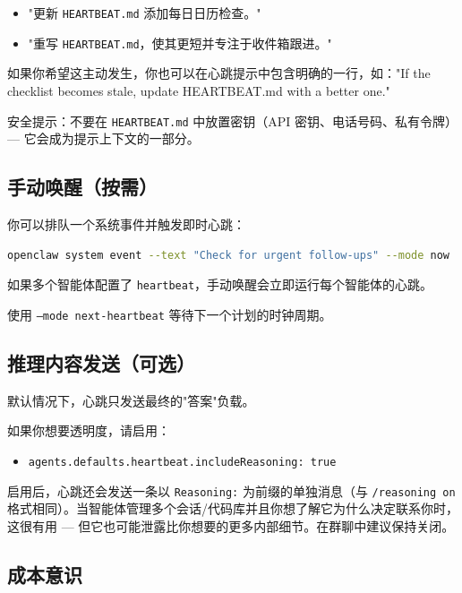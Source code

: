 \begin{itemize}
  \item "更新 \texttt{HEARTBEAT.md} 添加每日日历检查。"
  \item "重写 \texttt{HEARTBEAT.md}，使其更短并专注于收件箱跟进。"
\end{itemize}


如果你希望这主动发生，你也可以在心跳提示中包含明确的一行，如："If the checklist becomes stale, update HEARTBEAT.md with a better one."

安全提示：不要在 \texttt{HEARTBEAT.md} 中放置密钥（API 密钥、电话号码、私有令牌）— 它会成为提示上下文的一部分。

\subsection{手动唤醒（按需）}


你可以排队一个系统事件并触发即时心跳：

\begin{lstlisting}[language=bash]
openclaw system event --text "Check for urgent follow-ups" --mode now
\end{lstlisting}


如果多个智能体配置了 \texttt{heartbeat}，手动唤醒会立即运行每个智能体的心跳。

使用 \texttt{--mode next-heartbeat} 等待下一个计划的时钟周期。

\subsection{推理内容发送（可选）}


默认情况下，心跳只发送最终的"答案"负载。

如果你想要透明度，请启用：

\begin{itemize}
  \item \texttt{agents.defaults.heartbeat.includeReasoning: true}
\end{itemize}


启用后，心跳还会发送一条以 \texttt{Reasoning:} 为前缀的单独消息（与 \texttt{/reasoning on} 格式相同）。当智能体管理多个会话/代码库并且你想了解它为什么决定联系你时，这很有用 — 但它也可能泄露比你想要的更多内部细节。在群聊中建议保持关闭。

\subsection{成本意识}


